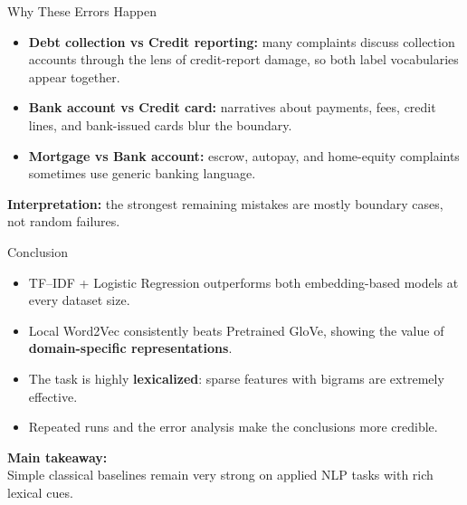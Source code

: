 \documentclass[aspectratio=169,10pt]{beamer}
\begin{document}
\begin{frame}{Why These Errors Happen}
\begin{itemize}
    \item \textbf{Debt collection vs Credit reporting:} many complaints discuss collection accounts through the lens of credit-report damage, so both label vocabularies appear together.
    \item \textbf{Bank account vs Credit card:} narratives about payments, fees, credit lines, and bank-issued cards blur the boundary.
    \item \textbf{Mortgage vs Bank account:} escrow, autopay, and home-equity complaints sometimes use generic banking language.
\end{itemize}

\vspace{0.25cm}
\textbf{Interpretation:} the strongest remaining mistakes are mostly boundary cases, not random failures.
\end{frame}

\begin{frame}{Conclusion}
\begin{itemize}
    \item TF--IDF + Logistic Regression outperforms both embedding-based models at every dataset size.
    \item Local Word2Vec consistently beats Pretrained GloVe, showing the value of \textbf{domain-specific representations}.
    \item The task is highly \textbf{lexicalized}: sparse features with bigrams are extremely effective.
    \item Repeated runs and the error analysis make the conclusions more credible.
\end{itemize}

\vspace{0.35cm}
\centering
\Large \textbf{Main takeaway:}\\[0.15cm]
Simple classical baselines remain very strong on applied NLP tasks with rich lexical cues.
\end{frame}
\end{document}
